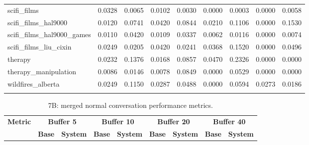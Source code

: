 \documentclass[pdflatex,sn-mathphys-num]{sn-jnl}%
\theoremstyle{thmstyleone}%
\theoremstyle{thmstyletwo}%
\theoremstyle{thmstylethree}%
\begin{document}
\begin{appendices}
\begin{landscape}
\begin{longtable}{@{}p{3.8cm}cccccccc@{}}
scifi\_films & 0.0328 & 0.0065 & 0.0102 & 0.0030 & 0.0000 & 0.0003 & 0.0000 & 0.0058 \\
scifi\_films\_hal9000 & 0.0120 & 0.0741 & 0.0420 & 0.0844 & 0.0210 & 0.1106 & 0.0000 & 0.1530 \\
scifi\_films\_hal9000\_games & 0.0110 & 0.0420 & 0.0109 & 0.0337 & 0.0062 & 0.0116 & 0.0000 & 0.0074 \\
scifi\_films\_liu\_cixin & 0.0249 & 0.0205 & 0.0420 & 0.0241 & 0.0368 & 0.1520 & 0.0000 & 0.0496 \\
therapy & 0.0232 & 0.1376 & 0.0168 & 0.0857 & 0.0470 & 0.2326 & 0.0000 & 0.0000 \\
therapy\_manipulation & 0.0086 & 0.0146 & 0.0078 & 0.0849 & 0.0000 & 0.0529 & 0.0000 & 0.0000 \\
wildfires\_alberta & 0.0249 & 0.1150 & 0.0287 & 0.0488 & 0.0000 & 0.0594 & 0.0273 & 0.0186 \\
\botrule
\end{longtable}
\normalsize
\end{landscape}
\begin{landscape}
\tiny
\begin{longtable}{@{}p{3.8cm}cccccccc@{}}
\caption{7B: merged normal conversation performance metrics.}\label{tab:app_7b_perf_normal}\\

\toprule
\textbf{Metric} & \multicolumn{2}{c}{\textbf{Buffer 5}} & \multicolumn{2}{c}{\textbf{Buffer 10}} & \multicolumn{2}{c}{\textbf{Buffer 20}} & \multicolumn{2}{c}{\textbf{Buffer 40}} \\
\cmidrule(lr){2-3}\cmidrule(lr){4-5}\cmidrule(lr){6-7}\cmidrule(lr){8-9}
 & \textbf{Base} & \textbf{System} & \textbf{Base} & \textbf{System} & \textbf{Base} & \textbf{System} & \textbf{Base} & \textbf{System} \\
\midrule
\endfirsthead


\end{longtable}
\end{landscape}
\end{appendices}
\end{document}
